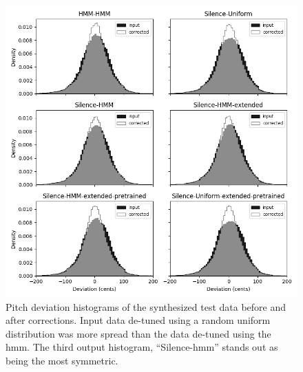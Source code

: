 \begin{figure}[t]
    \centering
    \includegraphics[width=\columnwidth]{figures/test-comparison.png}
    \caption{Pitch deviation histograms of the synthesized test data before and after corrections. Input data de-tuned using a random uniform distribution was more spread than the data de-tuned using the \gls{hmm}. The third output histogram, ``Silence-\gls{hmm}'' stands out as being the most symmetric.}
    \label{fig:test-comparison}
\end{figure}

